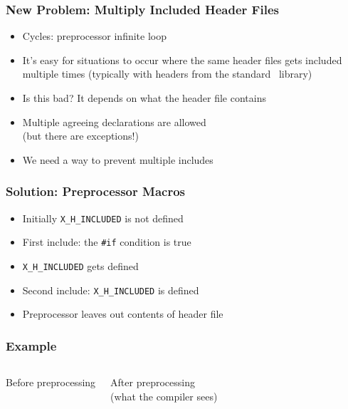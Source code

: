 \documentclass{../ucll-slides}
\begin{document}
\begin{frame}
  \frametitle{New Problem: Multiply Included Header Files}
  \begin{itemize}
    \item Cycles: preprocessor infinite loop
    \item It's easy for situations to occur where the same header
          files gets included multiple times (typically with headers from
          the standard \cpp\ library)
    \item Is this bad? It depends on what the header file contains
    \item Multiple agreeing declarations are allowed \\ (but there are exceptions!)
    \item We need a way to prevent multiple includes
  \end{itemize}
\end{frame}

\begin{frame}
  \frametitle{Solution: Preprocessor Macros}
  \begin{itemize}
    \item Initially {\tt X\_H\_INCLUDED} is not defined
    \item First include: the {\tt \#if} condition is true
    \item {\tt X\_H\_INCLUDED} gets defined
    \item Second include: {\tt X\_H\_INCLUDED} is defined
    \item Preprocessor leaves out contents of header file
  \end{itemize}
\end{frame}

\begin{frame}
  \frametitle{Example}
  \begin{columns}[t]
    \column{5cm}
    \begin{center} Before preprocessing \end{center}
    \column{5cm}
    \begin{center} After preprocessing \\ (what the compiler sees) \end{center}
    \vskip2cm
  \end{columns}
\end{frame}
\end{document}
